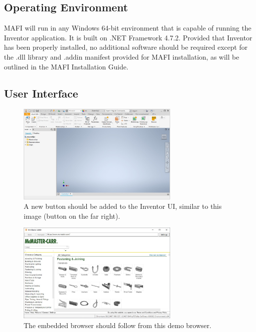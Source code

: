 \documentclass[12pt, letterpaper]{article}
\begin{document}
\subsection{Operating Environment}
MAFI will run in any Windows 64-bit environment that is capable of running the Inventor application. It is built on .NET Framework 4.7.2. Provided that Inventor has been properly installed, no additional software should be required except for the .dll library and .addin manifest provided for MAFI installation, as will be outlined in the MAFI Installation Guide.
\subsection{User Interface}
\begin{figure}[H]
    \centering
    \includegraphics[width=0.7\textwidth]{Figures/mcMasterButton.JPG}
    \caption{A new button should be added to the Inventor UI, similar to this image (button on the far right).}
\end{figure}
\begin{figure}[H]
    \centering
    \includegraphics[width=0.7\textwidth]{Figures/webBrowserView.jpg}
    \caption{The embedded browser should follow from this demo browser.}
\end{figure}
\end{document}
